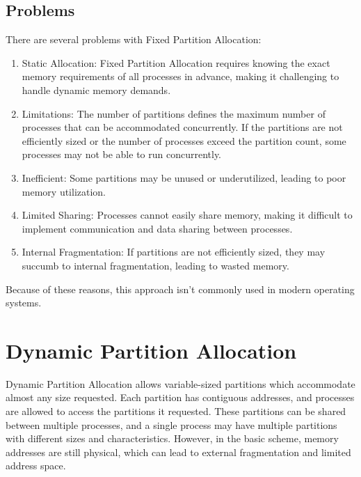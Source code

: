 \documentclass{report}
\begin{document}
\subsection{Problems}
\label{subsec:PROB}
There are several problems with Fixed Partition Allocation:
\begin{enumerate}[label=\textit{(\roman*)}]
\item Static Allocation: Fixed Partition Allocation requires knowing the exact memory requirements
  of all processes in advance, making it challenging to handle dynamic memory demands.
\item Limitations: The number of partitions defines the maximum number of processes that can be
  accommodated concurrently. If the partitions are not efficiently sized or the number of processes
  exceed the partition count, some processes may not be able to run concurrently.
\item Inefficient: Some partitions may be unused or underutilized, leading to poor memory
  utilization.
\item Limited Sharing: Processes cannot easily share memory, making it difficult to implement
  communication and data sharing between processes.
\item Internal Fragmentation: If partitions are not efficiently sized, they may succumb to internal
  fragmentation, leading to wasted memory.
\end{enumerate}
Because of these reasons, this approach isn't commonly used in modern operating systems.





\section{Dynamic Partition Allocation}
Dynamic Partition Allocation allows variable-sized partitions which accommodate almost any size
requested. Each partition has contiguous addresses, and processes are allowed to access the
partitions it requested. These partitions can be shared between multiple processes, and a single
process may have multiple partitions with different sizes and characteristics. However, in the basic
scheme, memory addresses are still physical, which can lead to external fragmentation and limited
address space. 
\end{document}
